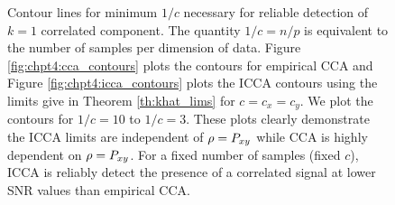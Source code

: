 \begin{figure}
  \begin{center}
    \caption{Contour lines for minimum $1/c$ necessary for reliable detection of $k=1$
      correlated component. The quantity $1/c = n/p$ is equivalent to the number of
      samples per dimension of data. Figure \ref{fig:chpt4:cca_contours} plots the
      contours for empirical CCA and Figure \ref{fig:chpt4:icca_contours} plots the ICCA
      contours using the limits give in Theorem \ref{th:khat_lims} for $c=c_x=c_y$. We
      plot the contours for $1/c=10$ to $1/c=3$.  These plots clearly demonstrate the ICCA
      limits are independent of $\rho=P_{xy}$ while CCA is highly dependent on
      $\rho=P_{xy}$. For a fixed number of samples (fixed $c$), ICCA is reliably detect the
      presence of a correlated signal at lower SNR values than empirical CCA.}
    \label{fig:chpt4:contours}
  \end{center}
\end{figure}

